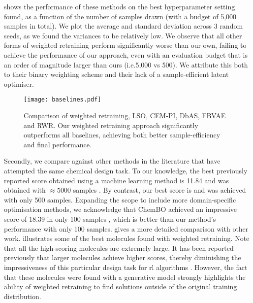  shows the performance of these methods on the best hyperparameter setting found, as a function of the number of samples drawn (with a budget of 5,000 samples in total).
We plot the average and standard deviation across 3 random seeds, as we found the variances to be relatively low.
We observe that all other forms of weighted retraining perform significantly worse than our own,
failing to achieve the performance of our approach, even with an evaluation budget that is an order of magnitude larger than ours (i.e.\@ 5,000 vs 500).
We attribute this both to their binary weighting scheme and their lack of a sample-efficient latent optimiser.

\begin{figure}[htb]
    \centering
    \texttt{[image: baselines.pdf]}
    \caption[Comparison of weighted retraining, LSO, CEM-PI, DbAS, FBVAE and RWR.]{
        Comparison of weighted retraining, LSO, CEM-PI, DbAS, FBVAE and RWR.
        Our weighted retraining approach significantly outperforms all baselines, achieving both better sample-efficiency and final performance.
    }
    \label{fig:baselines}
\end{figure}

Secondly, we compare against other methods in the literature that have attempted the same chemical design task.
To our knowledge, the best previously reported score obtained using a machine learning method is 11.84 and was obtained with $\approx5000$ samples \citep{zhou_optimization_2019}.
By contrast, our best score is \bestchemscore{} and was achieved with only 500 samples.
Expanding the scope to include more domain-specific optimisation methods,
we acknowledge that ChemBO achieved an impressive score of 18.39 in only 100 samples \citep{korovina2020chembo},
which is better than our method's performance with only 100 samples.
 gives a more detailed comparison with other work.
 illustrates some of the best molecules found with weighted retraining.
Note that all the high-scoring molecules are extremely large.
It has been reported previously that larger molecules achieve higher scores,
thereby diminishing the impressiveness of this particular design task for \gls{rl} algorithms \citep{zhou_optimization_2019}.
However, the fact that these molecules were found with a generative model strongly highlights
the ability of weighted retraining to find solutions outside of the original training distribution.

